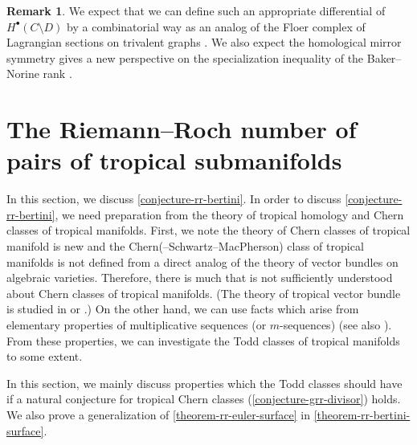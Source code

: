 \documentclass[a4paper,dvipdfmx,reqno,12pt]{amsart}
\theoremstyle{definition}
\newtheorem{remark}[theorem]{Remark}
\numberwithin{equation}{section}
\begin{document}
\begin{remark}
We expect that we can define such an appropriate
differential of $H^{\bullet}(C\setminus D)$
by a combinatorial way as an analog of
the Floer complex of Lagrangian sections on 
trivalent graphs
\cite{auroux2022lagrangian}.
We also expect the homological mirror symmetry
gives a new perspective on the specialization
inequality of the Baker--Norine rank 
\cite[Lemma 2.8]{MR2448666}. 
\end{remark}


\section{The Riemann--Roch number of pairs of
tropical submanifolds}
\label{section-on-rr-bertini}
In this section, we discuss \cref{conjecture-rr-bertini}.
In order to discuss \cref{conjecture-rr-bertini},
we need preparation from the theory of tropical homology
and Chern classes of tropical manifolds.
First, we note 
the theory of Chern classes of tropical manifold
\cite{demedrano2023chern} is new and 
the Chern(--Schwartz--MacPherson) class of
tropical manifolds is not defined from a direct analog
of the theory of vector bundles on algebraic varieties.
Therefore, there is much that is not sufficiently
understood about Chern classes of tropical manifolds.
(The theory of tropical vector bundle is studied
in \cite{MR2961320,MR4646329} or 
\cite[Theorem 1.8]{amini2020hodge}.)
On the other hand, we can use facts
which arise from elementary properties of
multiplicative sequences (or $m$-sequences)
\cite[]{MR1335917}
(see also \cite[]{MR440554}).
From these properties,
we can investigate the Todd classes
of tropical manifolds to some extent.

In this section, we mainly
discuss properties which 
the Todd classes should have if
a natural conjecture for
tropical Chern classes
(\cref{conjecture-grr-divisor}) holds.
We also prove a generalization of 
\cref{theorem-rr-euler-surface}
in \cref{theorem-rr-bertini-surface}.
\end{document}
